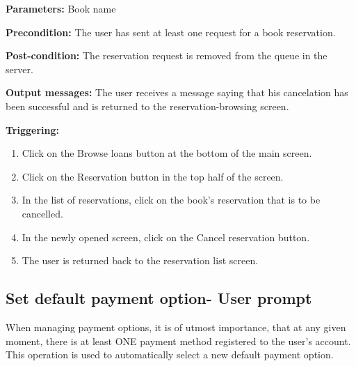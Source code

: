 \begin{description}

\item \textbf{Parameters:} Book name

\item \textbf{Precondition:} The user has sent at least one request for a book
reservation.

\item \textbf{Post-condition:} The reservation request is removed from the
queue in the server.

\item \textbf{Output messages:} The user receives a message saying that his
cancelation has been successful and is returned to the reservation-browsing
screen.

\item \textbf{Triggering:}
\begin{enumerate}
\item Click on the Browse loans button at the bottom of the main screen.

\item Click on the Reservation button in the top half of the screen.

\item  In the list of reservations, click on the book's reservation that is to
be cancelled.

\item In the newly opened screen, click on the Cancel reservation button.

\item The user is returned back to the reservation list screen.

\end{enumerate}

\end{description}

\subsection{Set default payment option- User prompt}

 When managing payment options, it is of utmost importance, that at any given
 moment, there is at least ONE payment method registered to the user's account.
 This operation is used to automatically select a new default payment option.

